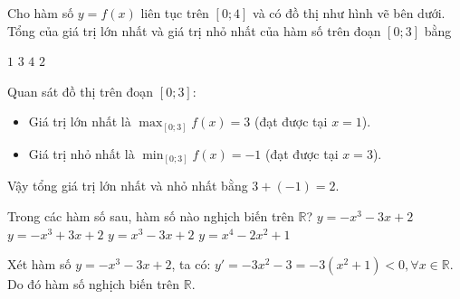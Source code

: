 \begin{ex}
Cho hàm số $y = f(x)$ liên tục trên $[0; 4]$ và có đồ thị như hình vẽ bên dưới. Tổng của giá trị lớn nhất và giá trị nhỏ nhất của hàm số trên đoạn $[0; 3]$ bằng
\begin{center}
\end{center}
\choice
{$1$}
{$3$}
{$4$}
{\True $2$}
\begin{loigiai}
Quan sát đồ thị trên đoạn $[0; 3]$:\begin{itemize}
    \item Giá trị lớn nhất là $\max_{[0; 3]} f(x) = 3$ (đạt được tại $x = 1$).
    \item Giá trị nhỏ nhất là $\min_{[0; 3]} f(x) = -1$ (đạt được tại $x = 3$).
\end{itemize}
Vậy tổng giá trị lớn nhất và nhỏ nhất bằng $3 + (-1) = 2$.
\end{loigiai}
\end{ex}

\begin{ex}
Trong các hàm số sau, hàm số nào nghịch biến trên $\mathbb{R}$?
\choice
{\True $y = -x^3 - 3x + 2$}
{$y = -x^3 + 3x + 2$}
{$y = x^3 - 3x + 2$}
{$y = x^4 - 2x^2 + 1$}
\begin{loigiai}
Xét hàm số $y = -x^3 - 3x + 2$, ta có:
$y' = -3x^2 - 3 = -3(x^2 + 1) < 0, \forall x \in \mathbb{R}$.\\
Do đó hàm số nghịch biến trên $\mathbb{R}$.
\end{loigiai}
\end{ex}

